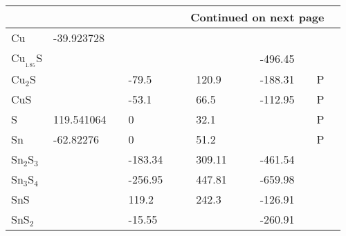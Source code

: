 \documentclass{article}
\begin{document}
\begin{center}
\begin{longtable}{|l|p{2.5cm}|l|p{2.5cm}|l|l|p{2.5cm}|l|l|p{2.5cm}|l|l|l|}
\hline \multicolumn{12}{|r|}{{Continued on next page}} \\ \hline
\endfoot

\hline
\endlastfoot


Cu                          & -39.923728 & \citep{Barin1977} &         &  &                                                &        &  &                                                &         &  &                      \\
Cu$_{_1.85}$S               &            &                     &         &  &                                                &        &  &                                                & -496.45 &  & \citep{Hiroi1986}  \\
Cu$_2$S                     &            &                     & -79.5   &  & \citep{Haynes2013}                           & 120.9  &  & \citep{Haynes2013}                           & -188.31 &  & P                    \\
CuS                         &            &                     & -53.1   &  & \citep{Haynes2013}                           & 66.5   &  & \citep{Haynes2013}                           & -112.95 &  & P                    \\
S                           & 119.541064 & \citep{Barin1977} & 0       &  & \citep{Barin1977}                            & 32.1   &  & \citep{Haynes2013}                           &         &  & P                    \\
Sn                          & -62.82276  & \citep{Barin1977} & 0       &  & \citep{Barin1977}                            & 51.2   &  & \citep{Haynes2013}                           &         &  & P                    \\
Sn$_2$S$_3$                 &            &                     & -183.34 &  & \citep{Barin1977}                            & 309.11 &  & \citep{Barin1977}                            & -461.54 &  & \citep{Barin1977}  \\
Sn$_3$S$_4$                 &            &                     & -256.95 &  & \citep{Barin1977}                            & 447.81 &  & \citep{Barin1977}                            & -659.98 &  & \citep{Barin1977}  \\
SnS                         &            &                     & 119.2   &  & \citep{WagmanDonaldD1969}                    & 242.3  &  & \citep{Hellwege1984}                         & -126.91 &  & \citep{Barin1977}  \\
SnS$_2$                     &            &                     & -15.55  &  &                                                &        &  &                                                & -260.91 &  & \citep{Barin1977}  \\

\end{longtable}
\end{center}
\end{document}
